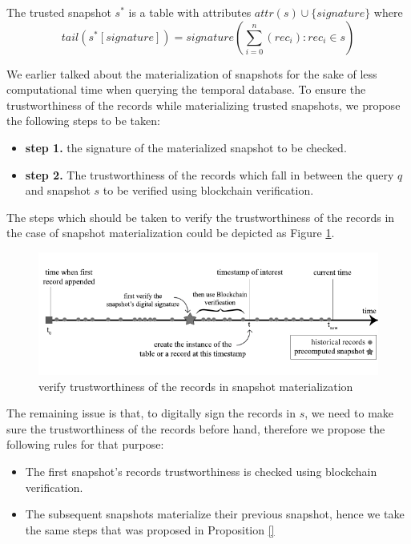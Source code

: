 \begin{defn} 
	The trusted snapshot $s^*$ is a table with attributes $attr(s)\cup \{signature\}$ where $$tail(s^*[signature]) = signature(\sum_{i=0}^n (rec_i):rec_i \in s)$$
\label{defn:trusted_snapshot}
\end{defn}

\begin{defn} 
	We earlier talked about the materialization of snapshots for the sake of less computational time when querying the temporal database. To ensure the trustworthiness of the records while materializing trusted snapshots, we propose the following steps to be taken:
	\begin{itemize}
		\item \textbf{step 1.} the signature of the materialized snapshot to be checked.
		\item \textbf{step 2.} The trustworthiness of the records which fall in between the query $q$ and snapshot $s$ to be verified using blockchain verification.
	\end{itemize}
	The steps which should be taken to verify the trustworthiness of the records in the case of snapshot materialization could be depicted as Figure \ref{fig:blockchain_snapshot_materialization}.
\label{defn:trusted_snapshot}
\end{defn}
\begin{figure}
	\centering
	\includegraphics[width=\textwidth]{figs/trusted_snapshot_materialization.pdf}
	\caption{verify trustworthiness of the records in snapshot materialization}
	\label{fig:blockchain_snapshot_materialization}
\end{figure}

The remaining issue is that, to digitally sign the records in $s$, we need to make sure the trustworthiness of the records before hand, therefore we propose the following rules for that purpose:

\begin{itemize}
	\item The first snapshot's records trustworthiness is checked using blockchain verification.
	\item The subsequent snapshots materialize their previous snapshot, hence we take the same steps that was proposed in Proposition \ref{}
\end{itemize}

